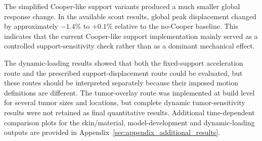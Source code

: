 The simplified Cooper-like support variants produced a much smaller global response change. In the available scout results, global peak displacement changed by approximately $-1.4\%$ to $+0.1\%$ relative to the no-Cooper baseline. This indicates that the current Cooper-like support implementation mainly served as a controlled support-sensitivity check rather than as a dominant mechanical effect.

The dynamic-loading results showed that both the fixed-support acceleration route and the prescribed support-displacement route could be evaluated, but these routes should be interpreted separately because their imposed motion definitions are different. The tumor-overlay route was implemented at build level for several tumor sizes and locations, but complete dynamic tumor-sensitivity results were not retained as final quantitative results. 
Additional time-dependent comparison plots for the skin/material, model-development and dynamic-loading outputs are provided in Appendix~\ref{sec:appendix_additional_results}.